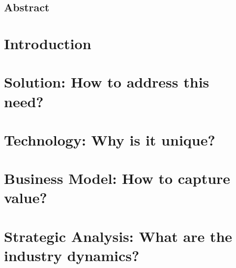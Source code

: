 \documentclass[a4paper, 11pt]{report}
\begin{document}
    

	{
		\FloatBarrier
		\newpage
        \setcounter{page}{2}
		\thispagestyle{plain}
		\vspace*{\fill}
			\section*{{\Large Abstract}}
			
		\vspace*{\fill}
	}

    {
        \FloatBarrier
        \newpage
        \tableofcontents
    }

	{
		\FloatBarrier
		\chapter{Introduction}
		\label{chp:introduction}
		
	}

	{
		\FloatBarrier
		\chapter{Solution: How to address this need?}
		\label{chp:solution}
		
	}

	{
		\FloatBarrier
		\chapter{Technology: Why is it unique?}
		\label{chp:technology}
		
	}

	{
		\FloatBarrier
		\chapter{Business Model: How to capture value?}
		\label{chp:business_model}
		
	}

	{
		\FloatBarrier
		\chapter{Strategic Analysis: What are the industry dynamics?}
		\label{chp:strategic_analysis}
		
	}
\end{document}
